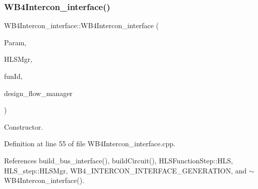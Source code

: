 \subsubsection{\texorpdfstring{W\+B4\+Intercon\+\_\+interface()}{WB4Intercon\_interface()}}
{\footnotesize\ttfamily W\+B4\+Intercon\+\_\+interface\+::\+W\+B4\+Intercon\+\_\+interface (\begin{DoxyParamCaption}\item[{const \hyperlink{Parameter_8hpp_a37841774a6fcb479b597fdf8955eb4ea}{Parameter\+Const\+Ref}}]{Param,  }\item[{const \hyperlink{hls__manager_8hpp_acd3842b8589fe52c08fc0b2fcc813bfe}{H\+L\+S\+\_\+manager\+Ref}}]{H\+L\+S\+Mgr,  }\item[{unsigned int}]{fun\+Id,  }\item[{const Design\+Flow\+Manager\+Const\+Ref}]{design\+\_\+flow\+\_\+manager }\end{DoxyParamCaption})}



Constructor. 



Definition at line 55 of file W\+B4\+Intercon\+\_\+interface.\+cpp.



References build\+\_\+bus\+\_\+interface(), build\+Circuit(), H\+L\+S\+Function\+Step\+::\+H\+LS, H\+L\+S\+\_\+step\+::\+H\+L\+S\+Mgr, W\+B4\+\_\+\+I\+N\+T\+E\+R\+C\+O\+N\+\_\+\+I\+N\+T\+E\+R\+F\+A\+C\+E\+\_\+\+G\+E\+N\+E\+R\+A\+T\+I\+ON, and $\sim$\+W\+B4\+Intercon\+\_\+interface().


